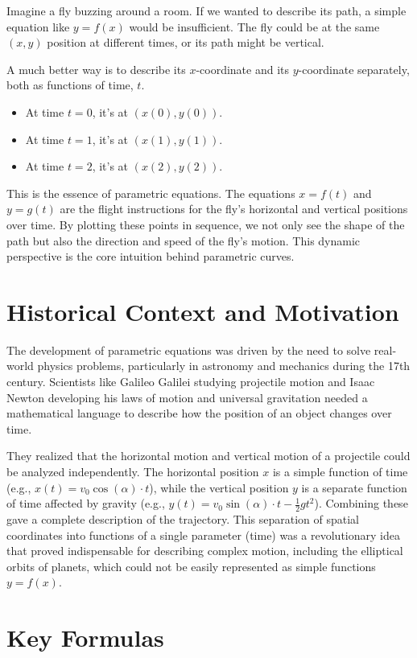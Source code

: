 \documentclass{article}
\begin{document}
Imagine a fly buzzing around a room. If we wanted to describe its path, a simple equation like $y=f(x)$ would be insufficient. The fly could be at the same $(x,y)$ position at different times, or its path might be vertical.

A much better way is to describe its $x$-coordinate and its $y$-coordinate separately, both as functions of time, $t$.
\begin{itemize}
    \item At time $t=0$, it's at $(x(0), y(0))$.
    \item At time $t=1$, it's at $(x(1), y(1))$.
    \item At time $t=2$, it's at $(x(2), y(2))$.
\end{itemize}
This is the essence of parametric equations. The equations $x=f(t)$ and $y=g(t)$ are the flight instructions for the fly's horizontal and vertical positions over time. By plotting these points in sequence, we not only see the shape of the path but also the direction and speed of the fly's motion. This dynamic perspective is the core intuition behind parametric curves.

\section{Historical Context and Motivation}

The development of parametric equations was driven by the need to solve real-world physics problems, particularly in astronomy and mechanics during the 17th century. Scientists like Galileo Galilei studying projectile motion and Isaac Newton developing his laws of motion and universal gravitation needed a mathematical language to describe how the position of an object changes over time.

They realized that the horizontal motion and vertical motion of a projectile could be analyzed independently. The horizontal position $x$ is a simple function of time (e.g., $x(t) = v_0 \cos(\alpha) \cdot t$), while the vertical position $y$ is a separate function of time affected by gravity (e.g., $y(t) = v_0 \sin(\alpha) \cdot t - \frac{1}{2}gt^2$). Combining these gave a complete description of the trajectory. This separation of spatial coordinates into functions of a single parameter (time) was a revolutionary idea that proved indispensable for describing complex motion, including the elliptical orbits of planets, which could not be easily represented as simple functions $y=f(x)$.

\section{Key Formulas}
\end{document}
